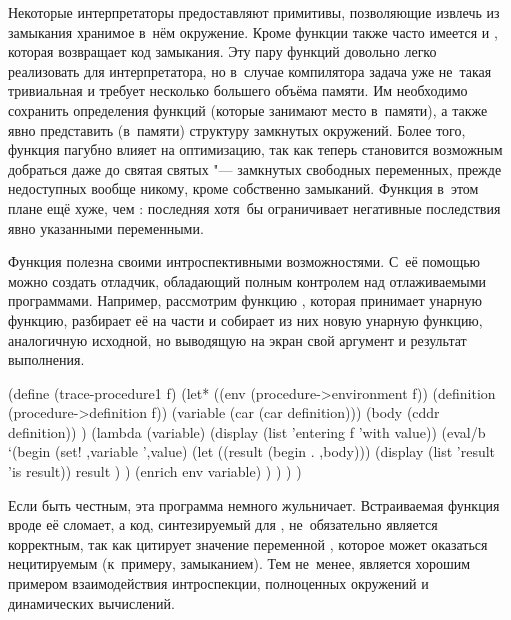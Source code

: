 Некоторые интерпретаторы предоставляют примитивы, позволяющие извлечь из
замыкания хранимое в~нём окружение. Кроме функции 
также часто имеется и , которая возвращает код
замыкания. Эту пару функций довольно легко реализовать для интерпретатора,
но в~случае компилятора задача уже не~такая тривиальная и требует несколько
большего объёма памяти. Им необходимо сохранить определения функций (которые
занимают место в~памяти), а также явно представить (в~памяти) структуру
замкнутых окружений. Более того, функция  пагубно
влияет на оптимизацию, так как теперь становится возможным добраться даже до
святая святых "--- замкнутых свободных переменных, прежде недоступных вообще никому, кроме собственно замыканий. Функция  в~этом плане ещё хуже,
чем : последняя хотя~бы ограничивает негативные последствия явно
указанными переменными.

Функция  полезна своими интроспективными
возможностями. С~её помощью можно создать отладчик, обладающий полным контролем
над отлаживаемыми программами. Например, рассмотрим функцию
, которая принимает унарную функцию, разбирает её на части
и собирает из них новую унарную функцию, аналогичную исходной, но выводящую на
экран свой аргумент и результат выполнения.

\begin{code:lisp}
(define (trace-procedure1 f)
  (let* ((env (procedure->environment f))
         (definition (procedure->definition f))
         (variable (car (car definition)))
         (body (cddr definition)) )
    (lambda (variable)
      (display (list 'entering f 'with value))
      (eval/b `(begin (set! ,variable ',value)
                      (let ((result (begin . ,body)))
                        (display (list 'result 'is result))
                        result ) )
              (enrich env variable) ) ) ) )
\end{code:lisp}

Если быть честным, эта программа немного жульничает. Встраиваемая функция вроде
 её сломает, а код, синтезируемый для , не~обязательно
является корректным, так как цитирует значение переменной , которое
может оказаться нецитируемым (к~примеру, замыканием). Тем не~менее,
 является хорошим примером взаимодействия интроспекции,
полноценных окружений и динамических вычислений.

